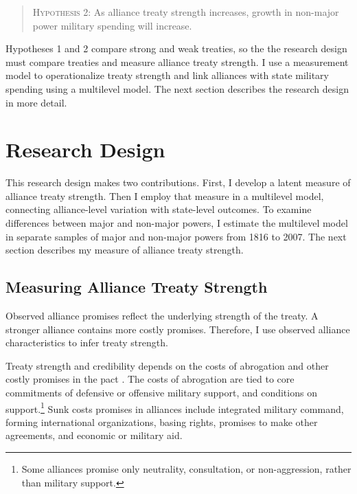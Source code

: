 \documentclass[12pt]{article}
\begin{document}
\begin{quote}
\textsc{Hypothesis 2}: As alliance treaty strength increases, growth in non-major power military spending will increase. 
\end{quote}


Hypotheses 1 and 2 compare strong and weak treaties, so the the research design must compare treaties and measure alliance treaty strength.  
I use a measurement model to operationalize treaty strength and link alliances with state military spending using a multilevel model. 
The next section describes the research design in more detail. 



\section{Research Design} 


This research design makes two contributions. 
First, I develop a latent measure of alliance treaty strength. 
Then I employ that measure in a multilevel model, connecting alliance-level variation with state-level outcomes. 
To examine differences between major and non-major powers, I estimate the multilevel model in separate samples of major and non-major powers from 1816 to 2007. 
The next section describes my measure of alliance treaty strength. 


\subsection{Measuring Alliance Treaty Strength} 

Observed alliance promises reflect the underlying strength of the treaty. 
A stronger alliance contains more costly promises. 
Therefore, I use observed alliance characteristics to infer treaty strength.


Treaty strength and credibility depends on the costs of abrogation and other costly promises in the pact \citep{Leeds2003}. 
The costs of abrogation are tied to core commitments of defensive or offensive military support, and conditions on support.\footnote{Some alliances promise only neutrality, consultation, or non-aggression, rather than military support.}  
Sunk costs promises in alliances include integrated military command, forming international organizations, basing rights, promises to make other agreements, and economic or military aid. 
\end{document}
